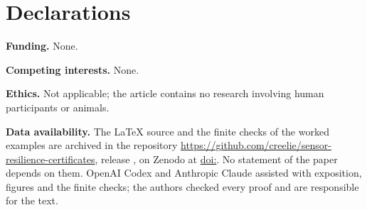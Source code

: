 \section*{Declarations}

\noindent\textbf{Funding.} None.

\noindent\textbf{Competing interests.} None.

\noindent\textbf{Ethics.} Not applicable; the article contains no research involving human participants or animals.

\noindent\textbf{Data availability.} The \LaTeX{} source and the finite checks of the worked examples are archived in the repository \url{https://github.com/creelie/sensor-resilience-certificates}, release \releaseTag, on Zenodo at \href{https://doi.org/\zenodoCodeID}{doi:\zenodoCodeID}. No statement of the paper depends on them. OpenAI Codex and Anthropic Claude assisted with exposition, figures and the finite checks; the authors checked every proof and are responsible for the text.
